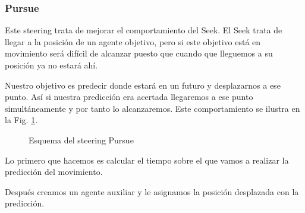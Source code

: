 \subsubsection{Pursue}

Este steering trata de mejorar el comportamiento del Seek. El Seek trata de llegar a la posición de un agente objetivo, pero si este objetivo está en movimiento será difícil de alcanzar puesto que cuando que lleguemos a su posición ya no estará ahí.

Nuestro objetivo es predecir donde estará en un futuro y desplazarnos a ese punto. Así si nuestra predicción era acertada llegaremos a ese punto simultáneamente y por tanto lo alcanzaremos. Este comportamiento se ilustra en la Fig. \ref{fig:pursue}.

\begin{figure}[H]
    \centering
    
    \caption{Esquema del steering Pursue}
    \label{fig:pursue}
\end{figure}

Lo primero que hacemos es calcular el tiempo sobre el que vamos a realizar la predicción del movimiento.



Después creamos un agente auxiliar y le asignamos la posición desplazada con la predicción.


